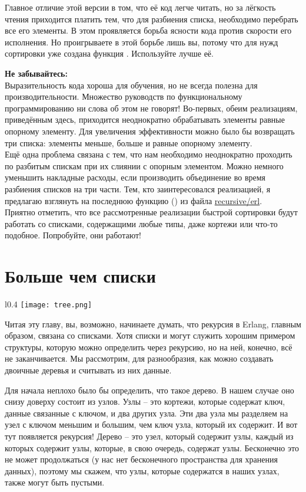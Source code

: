 Главное отличие этой версии в том, что её код легче читать, но за лёгкость чтения приходится платить тем, что для разбиения списка, необходимо перебрать все его элементы.
В этом проявляется борьба ясности кода против скорости его исполнения.
Но проигрываете в этой борьбе лишь вы, потому что для нужд сортировки уже создана функция .
Используйте лучше её.\\
\colorbox{lorange}
{
    \begin{minipage}{1.0\linewidth}
\textbf{Не забывайтесь:}\\
Выразительность кода хороша для обучения, но не всегда полезна для производительности.
Множество руководств по функциональному программированию ни слова об этом не говорят!
Во\--первых, обеим реализациям, приведённым здесь, приходится неоднократно обрабатывать элементы равные опорному элементу.
Для увеличения эффективности можно было бы возвращать три списка: элементы меньше, больше и равные опорному элементу.\\
Ещё одна проблема связана с тем, что нам необходимо неоднократно проходить по разбитым спискам при их слиянии с опорным элементом.
Можно немного уменьшить накладные расходы, если производить объединение во время разбиения списков на три части.
Тем, кто заинтересовался реализацией, я предлагаю взглянуть на последнюю функцию () из файла \href{http://learnyousomeerlang.com/static/erlang/recursive.erl}{recursive/erl}.\\
Приятно отметить, что все рассмотренные реализации быстрой сортировки будут работать со списками, содержащими любые типы, даже кортежи или что\--то подобное.
Попробуйте, они работают!
    \end{minipage}
}
\section{Больше чем списки}
\begin{wrapfigure}{l}{0.4\linewidth}
    \texttt{[image: tree.png]}
\end{wrapfigure}
Читая эту главу, вы, возможно, начинаете думать, что рекурсия в Erlang, главным образом, связана со списками.
Хотя списки и могут служить хорошим примером структуры, которую можно определить через рекурсию, но на ней, конечно, всё не заканчивается.
Мы рассмотрим, для разнообразия, как можно создавать двоичные деревья и считывать из них данные.

Для начала неплохо было бы определить, что такое дерево.
В нашем случае оно снизу доверху состоит из узлов.
Узлы \--- это кортежи, которые содержат ключ, данные связанные с ключом, и два других узла.
Эти два узла мы разделяем на узел с ключом меньшим и большим, чем ключ узла, который их содержит.
И вот тут появляется рекурсия!
Дерево \--- это узел, который содержит узлы, каждый из которых содержит узлы, которые, в свою очередь, содержат узлы.
Бесконечно это не может продолжаться (у нас нет бесконечного пространства для хранения данных), поэтому мы скажем, что узлы, которые содержатся в наших узлах, также могут быть пустыми.

